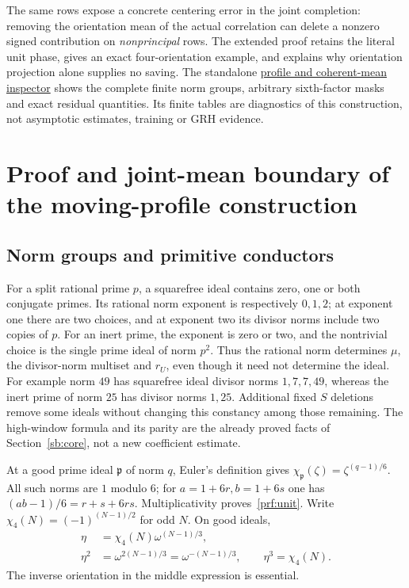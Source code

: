 \documentclass[11pt]{article}
\theoremstyle{definition}\newtheorem{definition}[theorem]{Definition}
\theoremstyle{remark}\newtheorem{remark}[theorem]{Remark}
\begin{document}
The same rows expose a concrete centering error in the joint completion:
removing the orientation mean of the actual correlation can delete a
nonzero signed contribution on \emph{nonprincipal} rows. The extended proof
retains the literal unit phase, gives an exact four-orientation example,
and explains why orientation projection alone supplies no saving. The
standalone \href{../profile-uniformity.html}{profile and coherent-mean inspector}
shows the complete finite norm groups, arbitrary sixth-factor masks and
exact residual quantities. Its finite tables are diagnostics of this
construction, not asymptotic estimates, training or GRH evidence.

\section{Proof and joint-mean boundary of the moving-profile construction}\label{prf:details}
\subsection{Norm groups and primitive conductors}
For a split rational prime $p$, a squarefree ideal contains zero, one or
both conjugate primes. Its rational norm exponent is respectively $0,1,2$;
at exponent one there are two choices, and at exponent two its divisor
norms include two copies of $p$. For an inert prime, the exponent is zero
or two, and the nontrivial choice is the single prime ideal of norm $p^2$.
Thus the rational norm determines $\mu$, the divisor-norm multiset and
$r_U$, even though it need not determine the ideal. For example norm $49$
has squarefree ideal divisor norms $1,7,7,49$, whereas the inert prime of
norm $25$ has divisor norms $1,25$. Additional fixed $S$ deletions remove
some ideals without changing this constancy among those remaining.
The high-window formula and its parity are the already proved facts of
Section~\ref{sb:core}, not a new coefficient estimate.

At a good prime ideal $\mathfrak p$ of norm $q$, Euler's definition gives
$\chi_{\mathfrak p}(\zeta)=\zeta^{(q-1)/6}$. All such norms are $1$ modulo
$6$; for $a=1+6r,b=1+6s$ one has
$(ab-1)/6=r+s+6rs$. Multiplicativity proves~\eqref{prf:unit}.
Write $\chi_4(N)=(-1)^{(N-1)/2}$ for odd $N$. On good ideals,
\begin{align*}
 \eta&=\chi_4(N)\omega^{(N-1)/3},\\
 \eta^2&=\omega^{2(N-1)/3}=\omega^{-(N-1)/3},\qquad
 \eta^3=\chi_4(N).
\end{align*}
The inverse orientation in the middle expression is essential.
\end{document}
